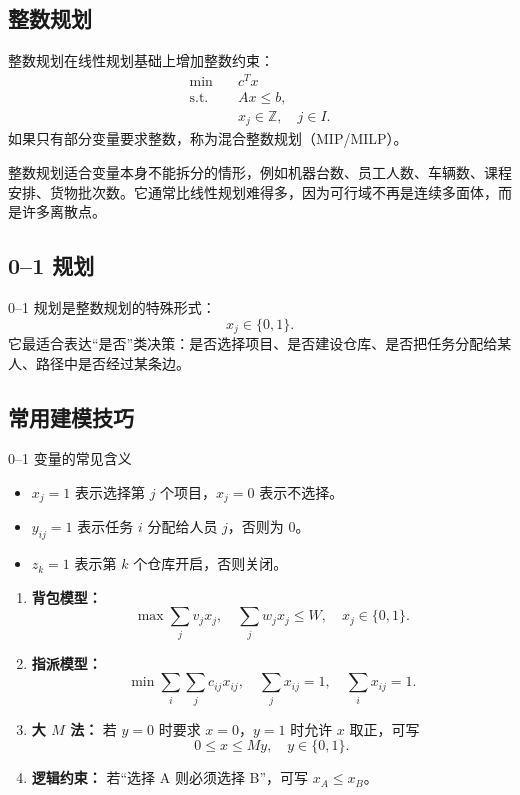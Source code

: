 \documentclass[11pt,a4paper]{ctexart}
\newcommand{\Z}{\mathbb{Z}}
\begin{document}
\subsection{整数规划}
整数规划在线性规划基础上增加整数约束：
\begin{equation}
\begin{aligned}
\min\quad & c^Tx\\
\text{s.t.}\quad & Ax\le b,\\
& x_j\in \Z,\quad j\in I.
\end{aligned}
\end{equation}
如果只有部分变量要求整数，称为混合整数规划（MIP/MILP）。

整数规划适合变量本身不能拆分的情形，例如机器台数、员工人数、车辆数、课程安排、货物批次数。它通常比线性规划难得多，因为可行域不再是连续多面体，而是许多离散点。

\subsection{0--1 规划}
0--1 规划是整数规划的特殊形式：
\[
 x_j\in\{0,1\}.
\]
它最适合表达“是否”类决策：是否选择项目、是否建设仓库、是否把任务分配给某人、路径中是否经过某条边。

\subsection{常用建模技巧}
\begin{paperbox}{0--1 变量的常见含义}
\begin{itemize}
\item $x_j=1$ 表示选择第 $j$ 个项目，$x_j=0$ 表示不选择。
\item $y_{ij}=1$ 表示任务 $i$ 分配给人员 $j$，否则为 $0$。
\item $z_k=1$ 表示第 $k$ 个仓库开启，否则关闭。
\end{itemize}
\end{paperbox}

\begin{enumerate}
\item \textbf{背包模型：}
\[
\max \sum_j v_jx_j,\quad \sum_j w_jx_j\le W,\quad x_j\in\{0,1\}.
\]
\item \textbf{指派模型：}
\[
\min\sum_i\sum_j c_{ij}x_{ij},\quad \sum_j x_{ij}=1,\quad \sum_i x_{ij}=1.
\]
\item \textbf{大 $M$ 法：} 若 $y=0$ 时要求 $x=0$，$y=1$ 时允许 $x$ 取正，可写
\[
0\le x\le My,\quad y\in\{0,1\}.
\]
\item \textbf{逻辑约束：} 若“选择 A 则必须选择 B”，可写 $x_A\le x_B$。
\end{enumerate}
\end{document}
